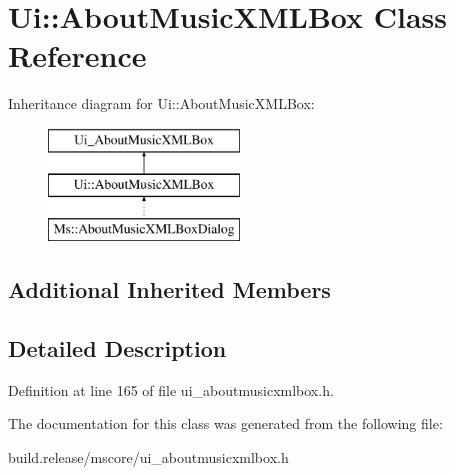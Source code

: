 \hypertarget{class_ui_1_1_about_music_x_m_l_box}{}\section{Ui\+:\+:About\+Music\+X\+M\+L\+Box Class Reference}
\label{class_ui_1_1_about_music_x_m_l_box}
Inheritance diagram for Ui\+:\+:About\+Music\+X\+M\+L\+Box\+:\begin{figure}[H]
\begin{center}
\leavevmode
\includegraphics[height=3.000000cm]{class_ui_1_1_about_music_x_m_l_box}
\end{center}
\end{figure}
\subsection*{Additional Inherited Members}


\subsection{Detailed Description}


Definition at line 165 of file ui\+\_\+aboutmusicxmlbox.\+h.



The documentation for this class was generated from the following file\+:\begin{DoxyCompactItemize}
\item 
build.\+release/mscore/ui\+\_\+aboutmusicxmlbox.\+h\end{DoxyCompactItemize}
